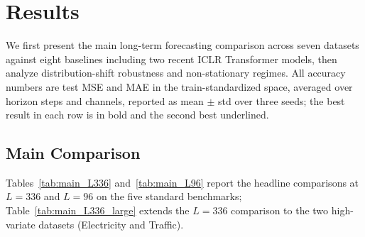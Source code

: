 \section{Results}
\label{sec:results}

We first present the main long-term forecasting comparison across seven datasets
against eight baselines including two recent ICLR Transformer models, then
analyze distribution-shift robustness and non-stationary regimes. All accuracy
numbers are test MSE and MAE in the train-standardized space, averaged over
horizon steps and channels, reported as mean $\pm$ std over three seeds; the
best result in each row is in bold and the second best underlined.

\subsection{Main Comparison}
\label{sec:results:main}

Tables~\ref{tab:main_L336} and~\ref{tab:main_L96} report the headline
comparisons at $L{=}336$ and $L{=}96$ on the five standard benchmarks;
Table~\ref{tab:main_L336_large} extends the $L{=}336$ comparison to the
two high-variate datasets (Electricity and Traffic).




